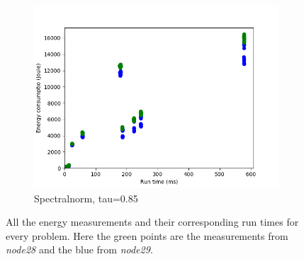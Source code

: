 \begin{figure}[h]
\begin{subfigure}[b]{0.45\textwidth}
        \includegraphics[width=\textwidth]{graphs/time-problem6.png}
        \caption{Spectralnorm, tau=0.85}
        \label{fig:time6}
    \end{subfigure}
    \caption{All the energy measurements and their corresponding run times for every problem. Here the green points are the measurements from \textit{node28} and the blue from \textit{node29}.}
    \label{fig:time}
\end{figure}



